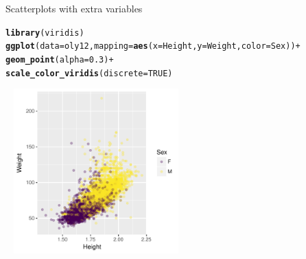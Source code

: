 \documentclass[10pt]{beamer}\usepackage[]{graphicx}\usepackage[]{color}
\makeatletter
\newcommand{\hlnum}[1]{\textcolor[rgb]{0.686,0.059,0.569}{#1}}%
\newcommand{\hlopt}[1]{\textcolor[rgb]{0,0,0}{#1}}%
\newcommand{\hlstd}[1]{\textcolor[rgb]{0.345,0.345,0.345}{#1}}%
\newcommand{\hlkwc}[1]{\textcolor[rgb]{0.333,0.667,0.333}{#1}}%
\newcommand{\hlkwd}[1]{\textcolor[rgb]{0.737,0.353,0.396}{\textbf{#1}}}%
\newenvironment{kframe}{%
 \def\at@end@of@kframe{}%
 \ifinner\ifhmode%
  \def\at@end@of@kframe{\end{minipage}}%
  \begin{minipage}{\columnwidth}%
 \fi\fi%
 \def\FrameCommand##1{\hskip\@totalleftmargin \hskip-\fboxsep
 \colorbox{shadecolor}{##1}\hskip-\fboxsep
     \hskip-\linewidth \hskip-\@totalleftmargin \hskip\columnwidth}%
 \MakeFramed {\advance\hsize-\width
   \@totalleftmargin\z@ \linewidth\hsize
   \@setminipage}}%
 {\par\unskip\endMakeFramed%
 \at@end@of@kframe}
\newenvironment{knitrout}{}{} %
\makeatother
\begin{document}
\begin{frame}[fragile]{Scatterplots with extra variables}

\begin{knitrout}\footnotesize
{}\color{fgcolor}\begin{kframe}
\begin{alltt}
\hlkwd{library}\hlstd{(viridis)}
\hlkwd{ggplot}\hlstd{(}\hlkwc{data} \hlstd{= oly12,} \hlkwc{mapping} \hlstd{=} \hlkwd{aes}\hlstd{(}\hlkwc{x} \hlstd{= Height,} \hlkwc{y} \hlstd{= Weight,} \hlkwc{color} \hlstd{= Sex))} \hlopt{+}
  \hlkwd{geom_point}\hlstd{(}\hlkwc{alpha} \hlstd{=} \hlnum{0.3}\hlstd{)} \hlopt{+}
  \hlkwd{scale_color_viridis}\hlstd{(}\hlkwc{discrete} \hlstd{=} \hlnum{TRUE}\hlstd{)}
\end{alltt}
\end{kframe}
\includegraphics[width=2.75in,height=2.5in]{figure/unnamed-chunk-8-1} 

\end{knitrout}

\end{frame}
\end{document}
